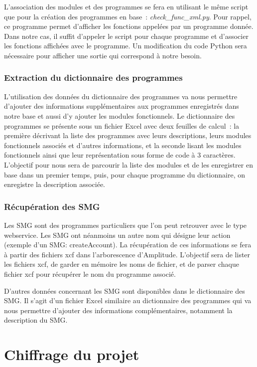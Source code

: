\documentclass{polytech/polytech}
\begin{document}
L’association des modules et des programmes se fera en utilisant le même script que pour la création des programmes en base : \textit{check\_func\_xml.py}. Pour rappel, ce programme permet d’afficher les fonctions appelées par un programme donnée. Dans notre cas, il suffit d’appeler le script pour chaque programme et d’associer les fonctions affichées avec le programme. Un modification du code Python sera nécessaire pour afficher une sortie qui correspond à notre besoin.


\subsection{Extraction du dictionnaire des programmes}

L’utilisation des données du dictionnaire des programmes va nous permettre d’ajouter des informations supplémentaires aux programmes enregistrés dans notre base et aussi d’y ajouter les modules fonctionnels. Le dictionnaire des programmes se présente sous un fichier Excel avec deux feuilles de calcul : la première décrivant la liste des programmes avec leurs descriptions, leurs modules fonctionnels associés et d’autres informations, et la seconde lisant les modules fonctionnels ainsi que leur représentation sous forme de code à 3 caractères. L’objectif pour nous sera de parcourir la liste des modules et de les enregistrer en base dans un premier temps, puis, pour chaque programme du dictionnaire, on enregistre la description associée. 


\subsection{Récupération des SMG}

Les SMG sont des programmes particuliers que l’on peut retrouver avec le type webservice. Les SMG ont néanmoins un autre nom qui désigne leur action (exemple d’un SMG: createAccount). La récupération de ces informations se fera à partir des fichiers xcf dans l’arborescence d’Amplitude. L’objectif sera de lister les fichiers xcf, de garder en mémoire les noms de fichier, et de parser chaque fichier xcf pour récupérer le nom du programme associé. 

D’autres données concernant les SMG sont disponibles dans le dictionnaire des SMG. Il s’agit d’un fichier Excel similaire au dictionnaire des programmes qui va nous permettre d’ajouter des informations complémentaires, notamment la description du SMG. 


\chapter{Chiffrage du projet}
\end{document}
